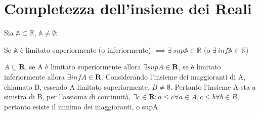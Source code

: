 \section{Completezza dell'insieme dei Reali}
Sia $\mathbb{A} \subset \mathbb{R}$, $\mathbb{A} \neq \emptyset$:
\begin{center}
Se $\mathbb{A}$ è limitato superiormente (o inferiormente) $\implies \exists\ sup\mathbb{A} \in \mathbb{R}$ (o $\exists\ inf\mathbb{A} \in \mathbb{R}$)
\end{center}
$A\subseteq \mathbf{R}$, se A \`e limitato superiormente allora $\exists supA \in \mathbf{R}$, se \`e limitato inferiormente allora $\exists infA \in \mathbf{R}$.
Considerando l'insieme dei maggioranti di A, chiamato B, essendo A limitato superiormente, $B\neq \emptyset$. Pertanto l'insieme A sta a sinistra di B, per l'assioma di 
continuit\`a, $\exists c \in \mathbf{R}: a\le c \forall a\in A, c\le b \forall b \in B$, pertanto esiste il minimo dei maggioranti, o supA.